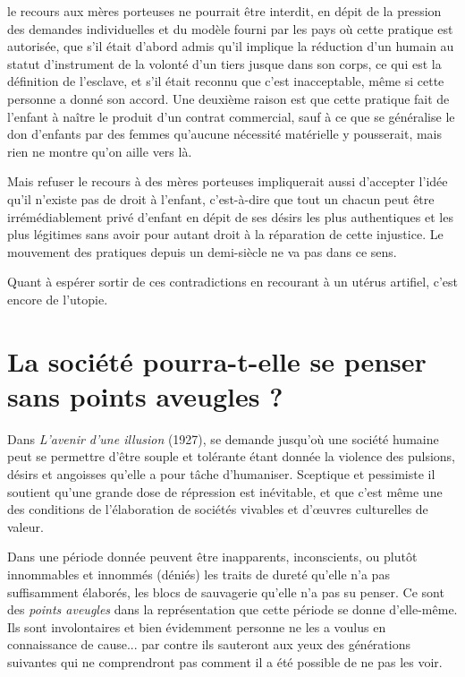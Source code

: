 le recours aux mères porteuses ne pourrait être interdit, en dépit de la pression des demandes individuelles et du modèle fourni par les pays où cette pratique est autorisée, que s'il était d'abord admis qu'il implique la réduction d'un humain au statut d'instrument de la volonté d'un tiers jusque dans son corps, ce qui est la définition de l'esclave, et s'il était reconnu que c'est inacceptable, même si cette personne a donné son accord. Une deuxième raison est que cette pratique fait de l'enfant à naître le produit d'un contrat commercial, sauf à ce que se généralise le don d'enfants par des femmes qu'aucune nécessité matérielle y pousserait, mais rien ne montre qu'on aille vers là.
  
  Mais refuser le recours à des mères porteuses impliquerait aussi d'accepter l'idée qu'il n'existe pas de droit à l'enfant, c'est-à-dire que tout un chacun peut être irrémédiablement privé d'enfant en dépit de ses désirs les plus authentiques et les plus légitimes sans avoir pour autant droit à la réparation de cette injustice. 
Le mouvement des pratiques depuis un demi-siècle ne va pas dans ce sens.

Quant à espérer sortir de ces contradictions en recourant à un utérus artifiel, c'est encore de l'utopie.
 
 
 
 
  
 
 

 \chapter{La société pourra-t-elle se penser sans points aveugles ?}
 
 Dans \emph{L'avenir d'une illusion} (1927),  se demande jusqu'où une société humaine peut se permettre d'être souple et tolérante étant donnée la violence des pulsions, désirs et angoisses qu'elle a pour tâche d'humaniser. Sceptique et pessimiste il soutient qu'une grande dose de répression est inévitable, et que c'est même une des conditions de l'élaboration de sociétés vivables et d'œuvres culturelles de valeur.

 Dans une période donnée peuvent être inapparents, inconscients, ou plutôt innommables et innommés (déniés) les traits de dureté qu'elle n'a pas suffisamment élaborés, les blocs de sauvagerie qu'elle n'a pas su penser. Ce sont des \emph{points aveugles} dans la représentation que cette période se donne d'elle-même. Ils sont involontaires et bien évidemment personne ne les a voulus en connaissance de cause... par contre ils sauteront aux yeux des générations suivantes qui ne comprendront pas comment il a été possible de ne pas les voir. 
 

